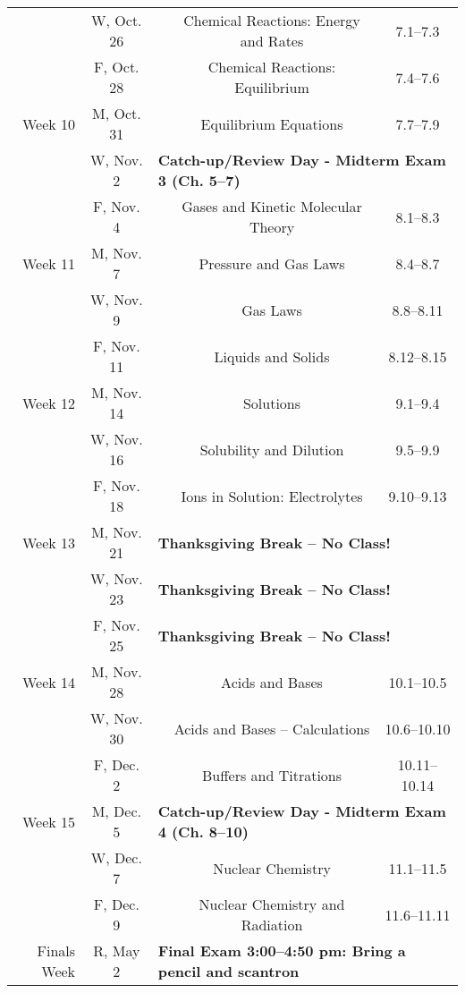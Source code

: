 \begin{tabular}{rcccc}
& W, Oct. 26&& Chemical Reactions: Energy and Rates & 7.1--7.3\\
& F, Oct. 28&& Chemical Reactions: Equilibrium & 7.4--7.6\\
\midrule
Week 10 & M, Oct. 31&& Equilibrium Equations & 7.7--7.9\\
& W, Nov. 2& \multicolumn{3}{l}{\textbf{Catch-up/Review Day - Midterm Exam 3 (Ch. 5--7)}}\\
& F, Nov. 4&& Gases and Kinetic Molecular Theory & 8.1--8.3\\
\midrule
Week 11 & M, Nov. 7&& Pressure and Gas Laws & 8.4--8.7\\
& W, Nov. 9&& Gas Laws & 8.8--8.11\\
& F, Nov. 11&& Liquids and Solids & 8.12--8.15\\
\midrule
Week 12 & M, Nov. 14&& Solutions & 9.1--9.4\\
& W, Nov. 16&& Solubility and Dilution & 9.5--9.9\\
& F, Nov. 18&& Ions in Solution: Electrolytes & 9.10--9.13\\
\midrule
Week 13 & M, Nov. 21& \multicolumn{3}{l}{\textbf{Thanksgiving Break -- No Class!}}\\
& W, Nov. 23& \multicolumn{3}{l}{\textbf{Thanksgiving Break -- No Class!}}\\
& F, Nov. 25& \multicolumn{3}{l}{\textbf{Thanksgiving Break -- No Class!}}\\
\midrule
Week 14 & M, Nov. 28&& Acids and Bases & 10.1--10.5\\
& W, Nov. 30&& Acids and Bases -- Calculations & 10.6--10.10\\
& F, Dec. 2&& Buffers and Titrations & 10.11--10.14\\
\midrule
Week 15 & M, Dec. 5& \multicolumn{3}{l}{\textbf{Catch-up/Review Day - Midterm Exam 4 (Ch. 8--10)}}\\
& W, Dec. 7&& Nuclear Chemistry & 11.1--11.5\\
& F, Dec. 9&& Nuclear Chemistry and Radiation & 11.6--11.11\\
\midrule
Finals Week& R, May 2& \multicolumn{3}{l}{\textbf{Final Exam 3:00--4:50 pm: Bring a pencil and scantron}}\\
\end{tabular}